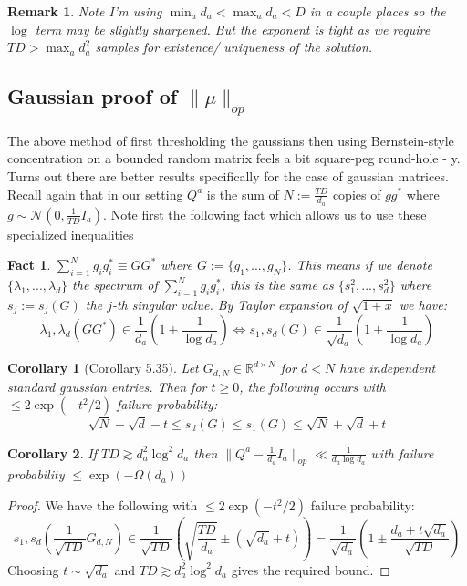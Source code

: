 \documentclass{article}
\newtheorem{corollary}{Corollary}
\newtheorem{fact}[theorem]{Fact}
\newtheorem{remark}{Remark}
\newcommand{\R}{{\mathbb{R}}}
\begin{document}
\begin{remark} Note I'm using $\min_{a} d_{a} < \max_{a} d_{a} < D$ in a couple places so the $\log$ term may be slightly sharpened. But the exponent is tight as we require $TD > \max_{a} d_{a}^{2}$ samples for existence/ uniqueness of the solution. 
\end{remark}


\subsection{Gaussian proof of $\|\mu\|_{op}$}
The above method of first thresholding the gaussians then using Bernstein-style concentration on a bounded random matrix feels a bit square-peg round-hole - y. Turns out there are better results specifically for the case of gaussian matrices. Recall again that in our setting $Q^{a}$ is the sum of $N := \frac{TD}{d_{a}}$ copies of $g g^{*}$ where $g \sim \mathcal{N}(0,\frac{1}{TD} I_{a})$. Note first the following fact which allows us to use these specialized inequalities

\begin{fact}
$\sum_{i=1}^{N} g_{i} g_{i}^{*} \equiv G G^{*} $ where $G := \{g_{1}, ..., g_{N}\}$. 
This means if we denote $\{\lambda_{1}, ..., \lambda_{d}\}$ the spectrum of $\sum_{i=1}^{N} g_{i} g_{i}^{*}$, this is the same as $\{s_{1}^{2}, ..., s_{d}^{2}\}$ where $s_{j} := s_{j}(G)$ the $j$-th singular value. By Taylor expansion of $\sqrt{1+x}$ we have:
\[ \lambda_{1},\lambda_{d}(GG^{*}) \in \frac{1}{d_{a}} \left( 1 \pm \frac{1}{\log d_{a}} \right) \iff s_{1},s_{d}(G) \in  \frac{1}{\sqrt{d_{a}}} \left( 1 \pm \frac{1}{\log d_{a}} \right)  \]
\end{fact}


\begin{corollary} [Corollary 5.35]
Let $G_{d,N} \in \R^{d \times N}$ for $d < N$ have independent standard gaussian entries. Then for $t \geq 0$, the following occurs with $\leq 2 \exp(-t^{2}/2)$ failure probability:
\[ \sqrt{N} - \sqrt{d} - t \leq s_{d}(G) \leq s_{1}(G) \leq \sqrt{N} + \sqrt{d} + t  \]
\end{corollary}

\begin{corollary}
If $TD \gtrsim d_{a}^{2} \log^{2} d_{a}$ then $\|Q^{a} - \frac{1}{d_{a}} I_{a} \|_{op} \ll \frac{1}{d_{a} \log d_{a}}$ with failure probability $\leq \exp( - \Omega(d_{a}))$
\end{corollary}
\begin{proof}
We have the following with $\leq 2 \exp(-t^{2}/2)$ failure probability:
\[ s_{1},s_{d}\left( \frac{1}{\sqrt{TD}} G_{d,N} \right) \in \frac{1}{\sqrt{TD}} \left( \sqrt{\frac{TD}{d_{a}}} \pm (\sqrt{d_{a}} + t) \right) = \frac{1}{\sqrt{d_{a}}}\left( 1 \pm \frac{d_{a} + t \sqrt{d_{a}}}{\sqrt{TD}}  \right)  \]
Choosing $t \sim \sqrt{d_{a}}$ and $TD \gtrsim d_{a}^{2} \log^{2} d_{a}$ gives the required bound. 
\end{proof}
\end{document}

